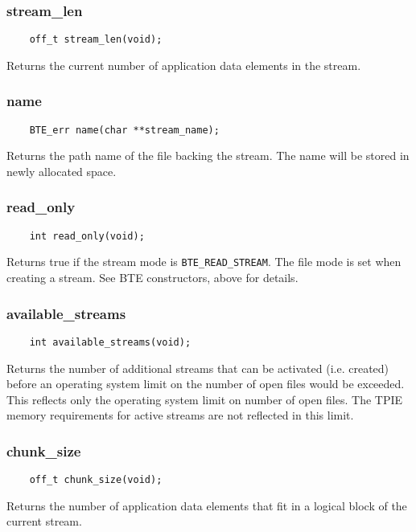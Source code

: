 \subsubsection{stream\_len}
\begin{lstlisting}
    off_t stream_len(void);
\end{lstlisting}
Returns the current number of application data elements in the stream.


\subsubsection{name}
\begin{lstlisting}
    BTE_err name(char **stream_name);
\end{lstlisting}
Returns the path name of the file backing the stream. The name will be
stored in newly allocated space.

\subsubsection{read\_only}
\begin{lstlisting}
    int read_only(void);
\end{lstlisting}
Returns true if the stream mode is \lstinline|BTE_READ_STREAM|. The file mode
is set when creating a
stream. See BTE constructors, above for details.

\subsubsection{available\_streams}
\begin{lstlisting}
    int available_streams(void);    
\end{lstlisting}
Returns the number of additional streams that can be
activated (i.e. created) before an
operating system limit on the number of open files would be
exceeded. This reflects only the operating system limit on
number of open files. The TPIE memory requirements for
active streams are not reflected in this limit.

\subsubsection{chunk\_size}
\begin{lstlisting}
    off_t chunk_size(void);
\end{lstlisting}
Returns the number of application data elements that fit in
a logical block of the current stream.


